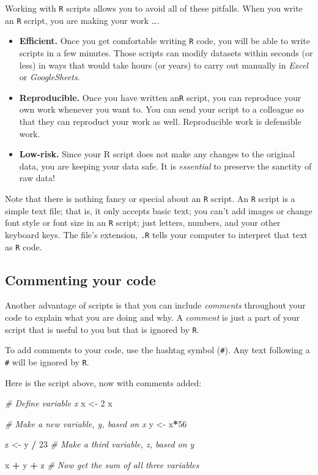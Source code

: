 \documentclass[
]{book}
\newenvironment{Shaded}{\begin{snugshade}}{\end{snugshade}}
\newcommand{\CommentTok}[1]{\textcolor[rgb]{0.56,0.35,0.01}{\textit{#1}}}
\newcommand{\DecValTok}[1]{\textcolor[rgb]{0.00,0.00,0.81}{#1}}
\newcommand{\NormalTok}[1]{#1}
\newcommand{\OtherTok}[1]{\textcolor[rgb]{0.56,0.35,0.01}{#1}}
\newcommand{\SpecialCharTok}[1]{\textcolor[rgb]{0.81,0.36,0.00}{\textbf{#1}}}
\begin{document}
Working with \texttt{R} scripts allows you to avoid all of these pitfalls. When you write an \texttt{R} script, you are making your work \ldots.

\begin{itemize}
\item
  \textbf{Efficient.} Once you get comfortable writing \texttt{R} code, you will be able to write scripts in a few minutes. Those scripts can modify datasets within seconds (or less) in ways that would take hours (or years) to carry out manually in \emph{Excel} or \emph{GoogleSheets}.
\item
  \textbf{Reproducible.} Once you have written an\texttt{R} script, you can reproduce your own work whenever you want to. You can send your script to a colleague so that they can reproduct your work as well. Reproducible work is defensible work.
\item
  \textbf{Low-risk.} Since your R script does not make any changes to the original data, you are keeping your data safe. It is \emph{essential} to preserve the sanctity of raw data!
\end{itemize}

Note that there is nothing fancy or special about an \texttt{R} script. An \texttt{R} script is a simple text file; that is, it only accepts basic text; you can't add images or change font style or font size in an \texttt{R} script; just letters, numbers, and your other keyboard keys. The file's extension, \texttt{.R} tells your computer to interpret that text as \texttt{R} code.

\subsection*{Commenting your code}\label{commenting-your-code}

Another advantage of scripts is that you can include \emph{comments} throughout your code to explain what you are doing and why. A \emph{comment} is just a part of your script that is useful to you but that is ignored by \texttt{R}.

To add comments to your code, use the hashtag symbol (\texttt{\#}). Any text following a \texttt{\#} will be ignored by \texttt{R}.

Here is the script above, now with comments added:

\begin{Shaded}
\begin{Highlighting}[]
\CommentTok{\# Define variable x}
\NormalTok{x }\OtherTok{\textless{}{-}} \DecValTok{2} 
\NormalTok{x}

\CommentTok{\# Make a new variable, y, based on x}
\NormalTok{y }\OtherTok{\textless{}{-}}\NormalTok{ x}\SpecialCharTok{*}\DecValTok{56}

\NormalTok{z }\OtherTok{\textless{}{-}}\NormalTok{ y }\SpecialCharTok{/} \DecValTok{23} \CommentTok{\# Make a third variable, z, based on y}
 
\NormalTok{x }\SpecialCharTok{+}\NormalTok{ y }\SpecialCharTok{+}\NormalTok{ z }\CommentTok{\# Now get the sum of all three variables}
\end{Highlighting}
\end{Shaded}
\end{document}
